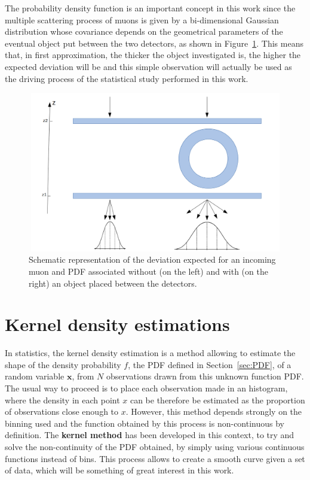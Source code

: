 \documentclass[a4paper, 11pt]{report}
\begin{document}
The probability density function is an important concept in this work since the multiple scattering process of muons is given by a bi-dimensional Gaussian distribution whose covariance depends on the geometrical parameters of the eventual object put between the two detectors, as shown in Figure~\ref{fig:deviation}. This means that, in first approximation, the thicker the object investigated is, the higher the expected deviation will be and this simple observation will actually be used as the driving process of the statistical study performed in this work.

\begin{figure}[htbp]
\centering
\includegraphics[width=11.5cm, height=7cm]{figs/pdfs.png}
\caption{Schematic representation of the deviation expected for an incoming muon and PDF associated without (on the left) and with (on the right) an object placed between the detectors.}
\label{fig:deviation}
\end{figure}

\section{Kernel density estimations} \label{sec:KDF}

In statistics, the kernel density estimation is a method allowing to estimate the shape of the density probability $f$, the PDF defined in Section~\ref{sec:PDF}, of a random variable $\bm x$, from $N$ observations drawn from this unknown function PDF. The usual way to proceed is to place each observation made in an histogram, where the density in each point $x$ can be therefore be estimated as the proportion of observations close enough to $x$. However, this method depends strongly on the binning used and the function obtained by this process is non-continuous by definition. The \textbf{kernel method} has been developed in this context, to try and solve the non-continuity of the PDF obtained, by simply using various continuous functions instead of bins. This process allows to create a smooth curve given a set of data, which will be something of great interest in this work.
\end{document}

